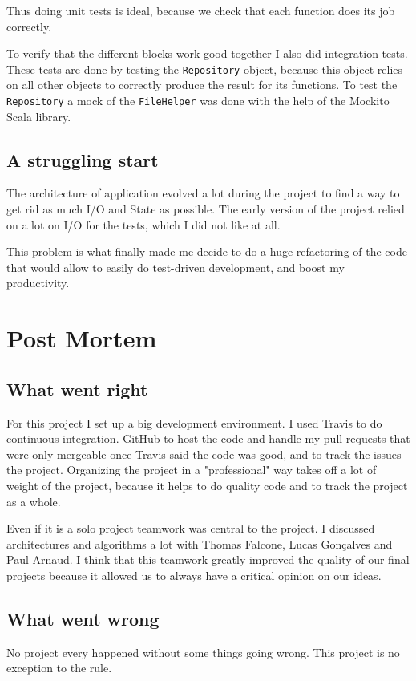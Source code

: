 \documentclass[12pt,a4paper]{scrartcl}
\begin{document}
Thus doing unit tests is ideal, because we check that each function does its
job correctly.

To verify that the different blocks work good together I also did integration
tests. These tests are done by testing the \lstinline{Repository} object,
because this object relies on all other objects to correctly produce the result
for its functions. To test the \lstinline{Repository} a mock of the
\lstinline{FileHelper} was done with the help of the Mockito Scala library.

\subsection{A struggling start}
The architecture of application evolved a lot during the project to find a way
to get rid as much I/O and State as possible. The early version of the project
relied on a lot on I/O for the tests, which I did not like at all.

This problem is what finally made me decide to do a huge refactoring of the
code that would allow to easily do test-driven development, and boost my
productivity.

\section{Post Mortem}

\subsection{What went right}
For this project I set up a big development environment. I used Travis to do
continuous integration. GitHub to host the code and handle my pull requests
that were only mergeable once Travis said the code was good, and to track the
issues the project. Organizing the project in a "professional" way takes off a lot
of weight of the project, because it helps to do quality code and to track
the project as a whole.

Even if it is a solo project teamwork was central to the project. I discussed
architectures and algorithms a lot with Thomas Falcone, Lucas Gonçalves and
Paul Arnaud. I think that this teamwork greatly improved the quality of our
final projects because it allowed us to always have a critical opinion on our
ideas.

\subsection{What went wrong}
No project every happened without some things going wrong. This project is no
exception to the rule.
\end{document}
